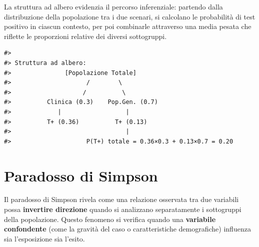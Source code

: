 \documentclass[
  letterpaper,
  DIV=11,
  numbers=noendperiod,
  oneside]{scrreprt}
\theoremstyle{definition}
\theoremstyle{plain}
\theoremstyle{definition}
\theoremstyle{remark}
\begin{document}
La struttura ad albero evidenzia il percorso inferenziale: partendo
dalla distribuzione della popolazione tra i due scenari, si calcolano le
probabilità di test positivo in ciascun contesto, per poi combinarle
attraverso una media pesata che riflette le proporzioni relative dei
diversi sottogruppi.

\begin{verbatim}
#> 
#> Struttura ad albero:
#>               [Popolazione Totale]
#>                     /        \
#>                    /          \
#>          Clinica (0.3)    Pop.Gen. (0.7)
#>             |                  |
#>          T+ (0.36)          T+ (0.13)
#>                                |
#>                     P(T+) totale = 0.36×0.3 + 0.13×0.7 = 0.20
\end{verbatim}

\section{Paradosso di Simpson}\label{paradosso-di-simpson}

Il paradosso di Simpson rivela come una relazione osservata tra due
variabili possa \textbf{invertire direzione} quando si analizzano
separatamente i sottogruppi della popolazione. Questo fenomeno si
verifica quando una \textbf{variabile confondente} (come la gravità del
caso o caratteristiche demografiche) influenza sia l'esposizione sia
l'esito.
\end{document}

